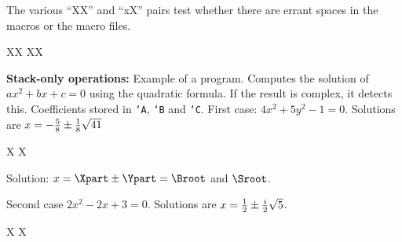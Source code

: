 \relax
The various ``XX'' and ``xX'' pairs test whether there are errant spaces
in the macros or the macro files.

X\relax X
X\relax X
\def\empty{}

\def\frac#1#2{{#1\over#2}}
\def\cs#1{{\tt \char`\\#1}}
\def\mybreak{\vskip 0pt plus 100pt\penalty 0 \vskip 0pt plus -100pt\relax}
\def\\{\hfil\break\ignorespaces}
\def\y{Rpop\Z\Z\\}
\def\Y{Rpop\Z\Z}
\everymath{\displaystyle}

{\bf Stack-only operations:}\\
Example of a program. Computes the solution of $ax^2 + bx + c = 0$ using
the quadratic formula. If the result is complex, it detects this.
Coefficients stored in \cs{A}, \cs{B} and \cs{C}. First case: $4x^2 +
5y^2 - 1= 0$. Solutions are $x = -\frac{5}{8} \pm \frac{1}{8}\sqrt{41}$

\def\A{4}\def\B{5}\def\C{-1}

X\startMFPprogram                   %
\Rpush\B\Rdup\Rsq                   %
\Rpush\A\Rpush\C\Rmul\Rdbl\Rdbl     %
\Rsub                               %
\Rsqrt\Rpush\A\Rdbl\Rdiv            %
\Rpop\Ypart                         %
\Rpush\A\Rdbl\Rdiv\Rchs             %
\Rpop\Xpart                         %
\Rpush\Xpart\Rpush\Ypart\Radd\Rpop\Broot
\Rpush\Xpart\Rpush\Ypart\Rsub\Rpop\Sroot
\Export\Xpart
\Export\Ypart
\Export\Broot
\Export\Sroot
\Export\I
\stopMFPprogram X

\indent Solution: $x = \Xpart \pm \I\Ypart = \Broot$ and $\Sroot$.

Second case $2x^2 - 2x + 3 = 0$. Solutions are $x = \frac{1}{2} \pm
\frac{i}{2}\sqrt{5}$.

\def\A{2}\def\B{-2}\def\C{3}

X\startMFPprogram                   %
\Rpush\B\Rdup\Rsq                   %
\Rpush\A\Rpush\C\Rmul\Rdbl\Rdbl     %
\Rsub                               %
\Rsqrt\Rpush\A\Rdbl\Rdiv            %
\Rpop\Ypart                         %
\Rpush\A\Rdbl\Rdiv\Rchs             %
\Rpop\Xpart                         %
\Export\Xpart
\Export\Ypart
\Export\I
\stopMFPprogram X

